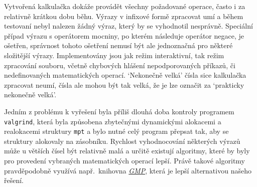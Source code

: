 Vytvořená kalkulačka dokáže provádět všechny požadované operace, často i za relativně krátkou dobu běhu. Výrazy v infixové formě zpracovat umí a během testovaní nebyl nalezen žádný výraz, který by se vyhodnotil nesprávně. Speciální případ výrazu s operátorem mocniny, po kterém následuje operátor negace, je ošetřen, správnost tohoto ošetření nemusí být ale jednoznačná pro některé složitější výrazy. Implementovány jsou jak režim interaktivní, tak režim zpracování souboru, včetně chybových hlášení nepodporovaných příkazů, či nedefinovaných matematických operací. `Nekonečně velká' čísla sice kalkulačka zpracovat neumí, čísla ale mohou být tak velká, že je lze označit za `prakticky nekonečně velká'.

Jedním z problému k vyřešení byla příliš dlouhá doba kontroly programem \verb|valgrind|, která byla  způsobena zbytečnými dynamickými alokacemi a realokacemi struktury \verb|mpt| a bylo nutné celý program přepsat tak, aby se struktury alokovaly na zásobníku. 
Rychlost vyhodnocování některých výrazů může u větších čísel být relativně malá a určitě existují algoritmy, které by byly pro provedení vybraných matematických operací lepší. Právě takové algoritmy pravděpodobně využívá např.~knihovna \href{https://gmplib.org/}{\textit{GMP}}, která je lepší alternativou našeho řešení.